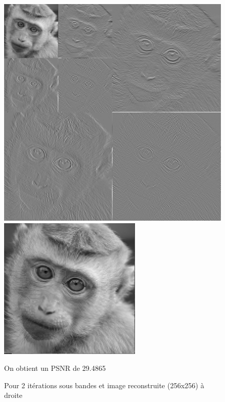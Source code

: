 \documentclass{article}
\begin{document}
\begin{figure}[h!]
\centerline{ \includegraphics[scale=0.5]{./rendus/4sousBandes2iterPGM.png} \includegraphics[scale=1]{./rendus/Reconstruite2.png} }
\caption{Pour 2 itérations sous bandes et image reconstruite (256x256) à droite} 
On obtient un PSNR de 29.4865
\end{figure}
\end{document}
